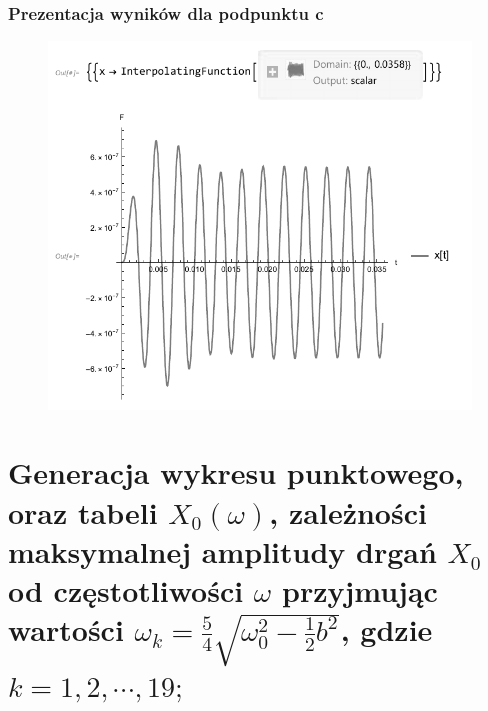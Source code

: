 \documentclass[polish,polish,a4paper]{article}
\begin{document}
		\subsubsection*{Prezentacja wyników dla podpunktu c}

		\begin{figure}[H]
			\centering
			\includegraphics[scale=1]{wyk3}
		\end{figure}
		
		\section{Generacja wykresu punktowego, oraz tabeli $X_{0}(\omega)$, zależności maksymalnej amplitudy drgań $X_{0}$ od częstotliwości $\omega$ przyjmując wartości $\omega_{k} = \frac{5}{4}\sqrt{\omega_{0}^2 - \frac{1}{2}b^2}$, gdzie $k = 1,2,\cdots,19;$}
		
\end{document}
